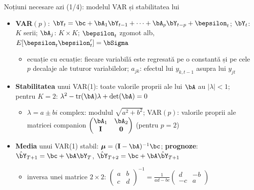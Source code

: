 \begin{frame}{Noțiuni necesare azi (1/4): modelul VAR și stabilitatea lui}
\itemsize{\small}
\begin{itemize}
    \item \textbf{VAR$(p)$}: $\bY_t = \bc + \bA_1\bY_{t-1} + \dots + \bA_p\bY_{t-p} + \bepsilon_t$; $\bY_t$: $K$ serii; $\bA_j$: $K \times K$; $\bepsilon_t$ zgomot alb, $E[\bepsilon_t\bepsilon_t'] = \bSigma$
    \begin{itemize}
        \item ecuație cu ecuație: fiecare variabilă este regresată pe o constantă și pe cele $p$ decalaje ale tuturor variabilelor; $a_{jk}$: efectul lui $y_{k,t-1}$ asupra lui $y_{jt}$
    \end{itemize}
    \item \textbf{Stabilitatea} unui VAR(1): toate valorile proprii ale lui $\bA$ au $|\lambda| < 1$; pentru $K = 2$: $\lambda^2 - \mathrm{tr}(\bA)\lambda + \det(\bA) = 0$
    \begin{itemize}
        \item $\lambda = a \pm bi$ complex: modulul $\sqrt{a^2 + b^2}$; VAR$(p)$: valorile proprii ale matricei companion $\begin{pmatrix} \bA_1 & \bA_2 \\ \mathbf{I} & \mathbf{0} \end{pmatrix}$ (pentru $p = 2$)
    \end{itemize}
    \item \textbf{Media} unui VAR(1) stabil: $\boldsymbol{\mu} = (\mathbf{I} - \bA)^{-1}\bc$; \textbf{prognoze}: $\hat\bY_{T+1} = \bc + \bA\bY_T$, $\hat\bY_{T+2} = \bc + \bA\hat\bY_{T+1}$
    \begin{itemize}
        \item inversa unei matrice $2 \times 2$: $\begin{pmatrix} a & b \\ c & d \end{pmatrix}^{-1} = \frac{1}{ad - bc}\begin{pmatrix} d & -b \\ -c & a \end{pmatrix}$
    \end{itemize}
\end{itemize}
\end{frame}

